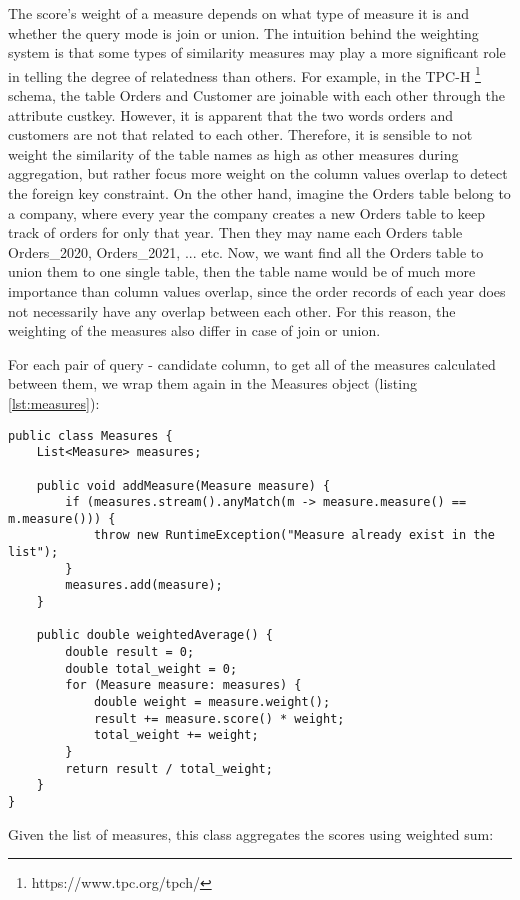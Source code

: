 The score's weight of a measure depends on what type of measure it is and whether the query mode is join or union. The intuition behind the weighting system is that some types of similarity measures may play a more significant role in telling the degree of relatedness than others. For example, in the TPC-H \footnote{https://www.tpc.org/tpch/} schema, the table Orders and Customer are joinable with each other through the attribute custkey. However, it is apparent that the two words orders and customers are not that related to each other. Therefore, it is sensible to not weight the similarity of the table names as high as other measures during aggregation, but rather focus more weight on the column values overlap to detect the foreign key constraint. On the other hand, imagine the Orders table belong to a company, where every year the company creates a new Orders table to keep track of orders for only that year. Then they may name each Orders table Orders\_2020, Orders\_2021, ... etc. Now, we want find all the Orders table to union them to one single table, then the table name would be of much more importance than column values overlap, since the order records of each year does not necessarily have any overlap between each other. For this reason, the weighting of the measures also differ in case of join or union.

For each pair of query - candidate column, to get all of the measures calculated between them, we wrap them again in the Measures object (listing \ref{lst:measures}):

\begin{lstlisting}[caption=The Measures object, label=lst:measures]
public class Measures {
    List<Measure> measures;

    public void addMeasure(Measure measure) {
        if (measures.stream().anyMatch(m -> measure.measure() == m.measure())) {
            throw new RuntimeException("Measure already exist in the list");
        }
        measures.add(measure);
    }

    public double weightedAverage() {
        double result = 0;
        double total_weight = 0;
        for (Measure measure: measures) {
            double weight = measure.weight();
            result += measure.score() * weight;
            total_weight += weight;
        }
        return result / total_weight;
    }
}
\end{lstlisting}

Given the list of measures, this class aggregates the scores using weighted sum:

